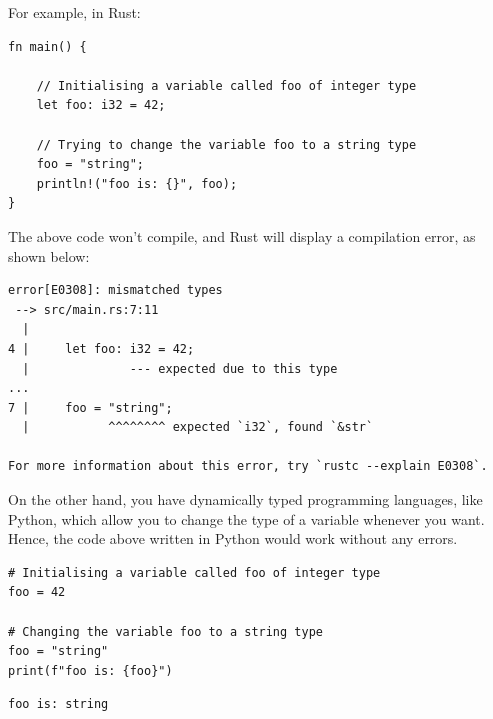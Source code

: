 \documentclass[11pt]{article}
\begin{document}
For example, in Rust:
\begin{verbatim}
fn main() {

    // Initialising a variable called foo of integer type
    let foo: i32 = 42;

    // Trying to change the variable foo to a string type
    foo = "string";
    println!("foo is: {}", foo);
}
\end{verbatim}

The above code won't compile,
and Rust will display a compilation error,
as shown below:
\begin{verbatim}
error[E0308]: mismatched types
 --> src/main.rs:7:11
  |
4 |     let foo: i32 = 42;
  |              --- expected due to this type
...
7 |     foo = "string";
  |           ^^^^^^^^ expected `i32`, found `&str`

For more information about this error, try `rustc --explain E0308`.
\end{verbatim}

 \newpage

On the other hand, you have dynamically typed programming languages,
like Python, which allow you to change the type of a variable
whenever you want. Hence, the code above written in Python would work
without any errors.
\begin{verbatim}
# Initialising a variable called foo of integer type
foo = 42

# Changing the variable foo to a string type
foo = "string"
print(f"foo is: {foo}")
\end{verbatim}

\begin{verbatim}
foo is: string
\end{verbatim}
\end{document}

